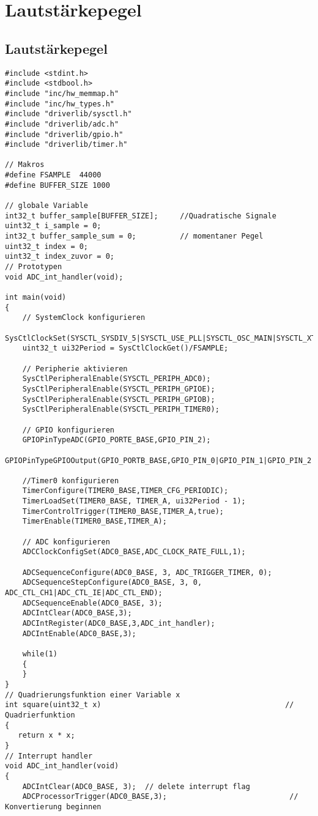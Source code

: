 \section{Lautstärkepegel}
\subsection{Lautstärkepegel}

\begin{lstlisting}
#include <stdint.h>
#include <stdbool.h>
#include "inc/hw_memmap.h"
#include "inc/hw_types.h"
#include "driverlib/sysctl.h"
#include "driverlib/adc.h"
#include "driverlib/gpio.h"
#include "driverlib/timer.h"

// Makros
#define FSAMPLE  44000
#define BUFFER_SIZE 1000

// globale Variable
int32_t buffer_sample[BUFFER_SIZE];     //Quadratische Signale
uint32_t i_sample = 0;
int32_t buffer_sample_sum = 0;          // momentaner Pegel
uint32_t index = 0;
uint32_t index_zuvor = 0;
// Prototypen
void ADC_int_handler(void);

int main(void)
{
    // SystemClock konfigurieren
    SysCtlClockSet(SYSCTL_SYSDIV_5|SYSCTL_USE_PLL|SYSCTL_OSC_MAIN|SYSCTL_XTAL_16MHZ);
    uint32_t ui32Period = SysCtlClockGet()/FSAMPLE;

    // Peripherie aktivieren
    SysCtlPeripheralEnable(SYSCTL_PERIPH_ADC0);
    SysCtlPeripheralEnable(SYSCTL_PERIPH_GPIOE);
    SysCtlPeripheralEnable(SYSCTL_PERIPH_GPIOB);
    SysCtlPeripheralEnable(SYSCTL_PERIPH_TIMER0);

    // GPIO konfigurieren
    GPIOPinTypeADC(GPIO_PORTE_BASE,GPIO_PIN_2);
    GPIOPinTypeGPIOOutput(GPIO_PORTB_BASE,GPIO_PIN_0|GPIO_PIN_1|GPIO_PIN_2|GPIO_PIN_3|GPIO_PIN_4|GPIO_PIN_5|GPIO_PIN_6|GPIO_PIN_7);

    //Timer0 konfigurieren
    TimerConfigure(TIMER0_BASE,TIMER_CFG_PERIODIC);
    TimerLoadSet(TIMER0_BASE, TIMER_A, ui32Period - 1);
    TimerControlTrigger(TIMER0_BASE,TIMER_A,true);
    TimerEnable(TIMER0_BASE,TIMER_A);

    // ADC konfigurieren
    ADCClockConfigSet(ADC0_BASE,ADC_CLOCK_RATE_FULL,1);

    ADCSequenceConfigure(ADC0_BASE, 3, ADC_TRIGGER_TIMER, 0);
    ADCSequenceStepConfigure(ADC0_BASE, 3, 0, ADC_CTL_CH1|ADC_CTL_IE|ADC_CTL_END);
    ADCSequenceEnable(ADC0_BASE, 3);
    ADCIntClear(ADC0_BASE,3);
    ADCIntRegister(ADC0_BASE,3,ADC_int_handler);
    ADCIntEnable(ADC0_BASE,3);

    while(1)
    {
    }
}
// Quadrierungsfunktion einer Variable x
int square(uint32_t x)                                          // Quadrierfunktion
{
   return x * x;
}
// Interrupt handler
void ADC_int_handler(void)
{
    ADCIntClear(ADC0_BASE, 3);  // delete interrupt flag
    ADCProcessorTrigger(ADC0_BASE,3);                            // Konvertierung beginnen


\end{lstlisting}
